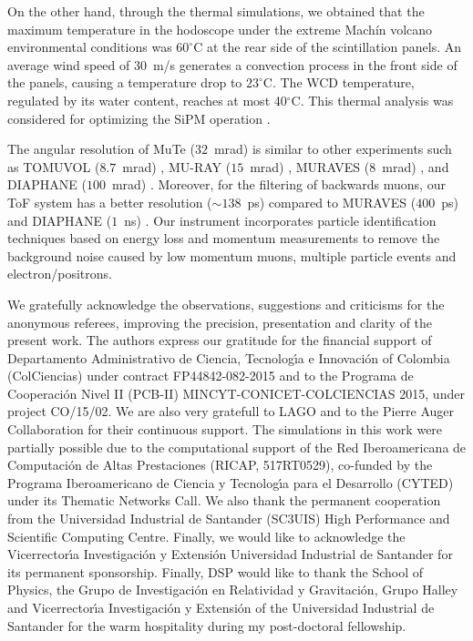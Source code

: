 \documentclass[letterpaper,11pt]{article}
\begin{document}
On the other hand, through the thermal simulations, we obtained that the maximum temperature in the hodoscope under the extreme Mach\'in volcano environmental conditions was $60^{\circ}$C at the rear side of the scintillation panels. An average wind speed of $30$~m/s generates a convection process in the front side of the panels, causing a temperature drop to $23^{\circ}$C. The WCD temperature, regulated by its water content, reaches at most 40$^{\circ}$C. This thermal analysis was considered for optimizing the SiPM operation \cite{PenaRodriguez2020}. 


The angular resolution of MuTe ($32$~mrad) is similar to other experiments such as TOMUVOL ($8.7$~mrad) \cite{Crloganu2013}, MU-RAY ($15$~mrad) \cite{Ambrosino2014}, MURAVES ($8$~mrad) \cite{Cimmino2017}, and DIAPHANE ($100$~mrad) \cite{Lesparre2012}. Moreover, for the filtering of backwards muons, our ToF system has a better resolution ($\sim 138$~ps) compared to MURAVES ($400$~ps) and DIAPHANE ($1$~ns) \cite{ jourde2013experimental}. Our instrument incorporates particle identification techniques based on energy loss and momentum measurements to remove the background noise caused by low momentum muons, multiple particle events and electron/positrons.



\acknowledgments
We gratefully acknowledge the observations, suggestions and criticisms for the anonymous referees, improving the precision, presentation and clarity of the present work. The authors express our gratitude for the  financial support of  Departamento Administrativo de Ciencia, Tecnolog\'{\i}a e Innovaci\'on of Colombia (ColCiencias) under contract FP44842-082-2015 and to the Programa de Cooperaci\'on Nivel II (PCB-II) MINCYT-CONICET-COLCIENCIAS 2015, under project CO/15/02.  We are also very gratefull to LAGO and to the Pierre Auger Collaboration for their continuous support.  The simulations in this work were partially possible due to the computational support of the Red Iberoamericana de Computaci\'on de Altas Prestaciones (RICAP, 517RT0529), co-funded by the Programa Iberoamericano de Ciencia y Tecnolog\'{\i}a para el Desarrollo (CYTED) under its Thematic Networks Call. We also thank the permanent cooperation from the Universidad Industrial de Santander (SC3UIS) High Performance and Scientific Computing Centre. Finally, we would like to acknowledge the Vicerrector\'{\i}a Investigaci\'on y Extensi\'on Universidad Industrial de Santander for its permanent sponsorship. Finally, DSP would like to thank the School of Physics, the Grupo de Investigación en Relatividad y Gravitación, Grupo Halley and Vicerrector\'{\i}a Investigaci\'on y Extensi\'on of the Universidad Industrial de Santander for the warm hospitality during my post-doctoral fellowship.
\end{document}
